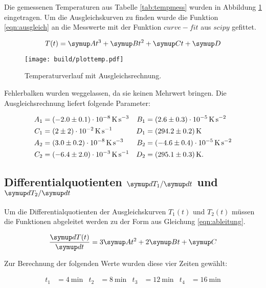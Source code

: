 Die gemessenen Temperaturen aus Tabelle \ref{tab:tempmess} wurden in Abbildung
\ref{fig:templot} eingetragen.
Um die Ausgleichskurven zu finden wurde die Funktion \eqref{eqn:ausgleich} an die
Messwerte mit der Funktion $curve-fit$ aus $scipy$ \cite{scipy} gefittet.

\begin{equation}
  T(t) = \g{A}t^3 + \g{B}t^2 + \g{C}t + \g{D}
  \label{eqn:ausgleich}
\end{equation}

\begin{figure}
  \centering
  \texttt{[image: build/plottemp.pdf]}
  \caption{Temperaturverlauf mit Ausgleichsrechnung.}
  \label{fig:templot}
\end{figure}

Fehlerbalken wurden weggelassen, da sie keinen Mehrwert bringen.
Die Ausgleichsrechnung liefert folgende Parameter:

\begin{align*}
  A_1 &= \SI{-2 +- 0.1 e-8}{\kelvin\per\cubic\second} &B_1 &= \SI{2.6(3)e-5}{\kelvin\per\second\squared}\\
  C_1 &= \SI{2(2)e-2}{\kelvin\per\second} &D_1 &= \SI{294.2(2)}{\kelvin}\\
  A_2 &= \SI{3.0(2)e-8}{\kelvin\per\cubic\second} &B_2 &= \SI{-4.6(4)e-5}{\kelvin\per\second\squared}\\
  C_2 &= \SI{-6.4 +- 2 e-3}{\kelvin\per\second} &D_2 &= \SI{295.1(3)}{\kelvin}.
\end{align*}

\subsection{Differentialquotienten $\g{d}T_1/\g{d}t$ und $\g{d}T_2/\g{d}t$}

Um die Differentialquotienten der Ausgleichskurven $T_1(t)$ und $T_2(t)$ müssen
die Funktionen abgeleitet werden zu der Form aus Gleichung \eqref{eqn:ableitung}.

\begin{equation}
  \frac{\g{d}T(t)}{\g{d}t} = 3 \g{A} t^2 + 2 \g{B} t + \g{C}
  \label{eqn:ableitung}
\end{equation}

Zur Berechnung der folgenden Werte wurden diese vier Zeiten gewählt:

\begin{align*}
  t_1 &= \SI{4}{\minute} & t_2 &= \SI{8}{\minute} & t_3 &= \SI{12}{\minute} & t_4 &= \SI{16}{\minute}
\end{align*}

